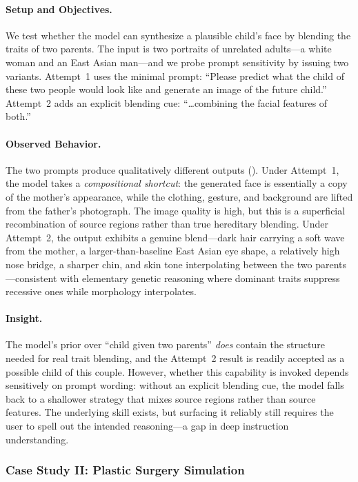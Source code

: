 \documentclass{llmxive}
\begin{document}
\paragraph{Setup and Objectives.}
We test whether the model can synthesize a plausible child's face by blending the traits of two parents. The input is two portraits of unrelated adults---a white woman and an East Asian man---and we probe prompt sensitivity by issuing two variants. Attempt~1 uses the minimal prompt: ``Please predict what the child of these two people would look like and generate an image of the future child.'' Attempt~2 adds an explicit blending cue: ``\dots combining the facial features of both.''

\paragraph{Observed Behavior.}
The two prompts produce qualitatively different outputs (). Under Attempt~1, the model takes a \emph{compositional shortcut}: the generated face is essentially a copy of the mother's appearance, while the clothing, gesture, and background are lifted from the father's photograph. The image quality is high, but this is a superficial recombination of source regions rather than true hereditary blending. Under Attempt~2, the output exhibits a genuine blend---dark hair carrying a soft wave from the mother, a larger-than-baseline East Asian eye shape, a relatively high nose bridge, a sharper chin, and skin tone interpolating between the two parents---consistent with elementary genetic reasoning where dominant traits suppress recessive ones while morphology interpolates.

\paragraph{Insight.}
The model's prior over ``child given two parents'' \emph{does} contain the structure needed for real trait blending, and the Attempt~2 result is readily accepted as a possible child of this couple. However, whether this capability is invoked depends sensitively on prompt wording: without an explicit blending cue, the model falls back to a shallower strategy that mixes source regions rather than source features. The underlying skill exists, but surfacing it reliably still requires the user to spell out the intended reasoning---a gap in deep instruction understanding.



\subsubsection{Case Study II: Plastic Surgery Simulation}
\end{document}
